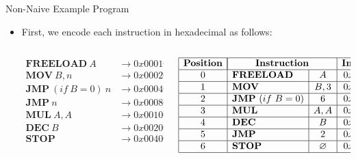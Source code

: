 \begin{frame}[allowframebreaks]{Non-Naive Example Program}
\begin{itemize}
\item First, we encode each instruction in hexadecimal as follows:
\begin{columns}
\begin{column}{0.5\textwidth}
\begin{align*}
\mathbf{FREELOAD}~A &\to 0x00010000 \\
\mathbf{MOV}~B,n &\to 0x00020000 + n \\
\mathbf{JMP}~(if~B = 0)~n &\to 0x00040000 + n \\
\mathbf{JMP}~n &\to 0x00080000 + n \\
\mathbf{MUL}~A,A &\to 0x00100000 \\
\mathbf{DEC}~B &\to 0x00200000 \\
\mathbf{STOP} &\to 0x00400000 
\end{align*}
\end{column}
\begin{column}{0.5\textwidth}
\[
\begin{array}{|c|l|c|c|}
\hline
\mathbf{Position} & \multicolumn{2}{|c|}{\mathbf{Instruction}} & \mathbf{Inst.~Value}\\ \hline
0 & \mathbf{FREELOAD} & A & 0x00010000 \\ \hline
1 & \mathbf{MOV} & B, 3 & 0x00020003 \\ \hline
2 & \mathbf{JMP}~(if~B = 0) & 6 & 0x00040006 \\ \hline
3 & \mathbf{MUL} & A, A & 0x00100000 \\ \hline
4 & \mathbf{DEC} & B & 0x00200000 \\ \hline
5 & \mathbf{JMP} & 2 & 0x00080002 \\ \hline
6 & \mathbf{STOP} & \emptyset & 0x00400000 \\ \hline
\end{array}
\]
\end{column}
\end{columns}
\end{itemize}
\end{frame}





